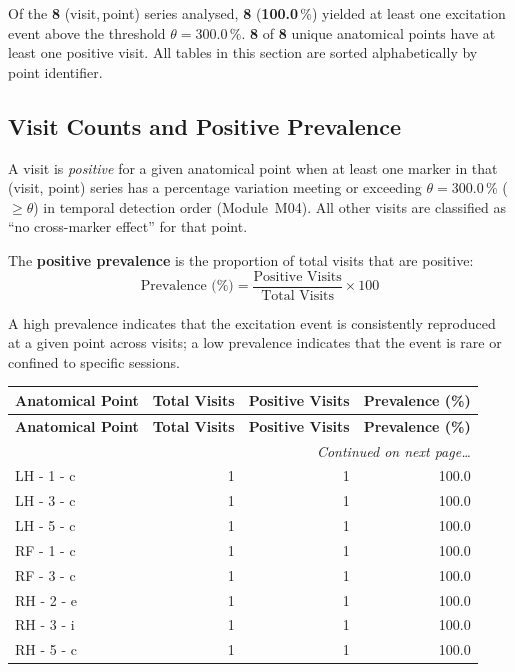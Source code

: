\documentclass[a4paper,11pt]{article}
\begin{document}
\noindent
Of the \textbf{8} (visit,\,point) series analysed,
\textbf{8} (\textbf{100.0}\,\%) yielded at least one
excitation event above the threshold $\theta = 300.0\,\%$.
\textbf{8} of \textbf{8} unique anatomical points
have at least one positive visit.
All tables in this section are sorted alphabetically by point identifier.

\subsection{Visit Counts and Positive Prevalence}

A visit is \emph{positive} for a given anatomical point when at least one marker in that
(visit, point) series has a percentage variation meeting or exceeding
$\theta = 300.0\,\%$ ($\geq \theta$) in temporal detection order (Module~M04).
All other visits are classified as ``no cross-marker effect'' for that point.

The \textbf{positive prevalence} is the proportion of total visits that are positive:
\[
  \text{Prevalence (\%)} = \frac{\text{Positive Visits}}{\text{Total Visits}} \times 100
\]

A high prevalence indicates that the excitation event is consistently reproduced at a given
point across visits; a low prevalence indicates that the event is rare or confined to
specific sessions.

\begin{small}
\begin{longtable}{p{5cm}rrr}
\toprule
\textbf{Anatomical Point} &
\textbf{Total Visits} &
\textbf{Positive Visits} &
\textbf{Prevalence (\%)} \\
\midrule
\endfirsthead
\toprule
\textbf{Anatomical Point} &
\textbf{Total Visits} &
\textbf{Positive Visits} &
\textbf{Prevalence (\%)} \\
\midrule
\endhead
\midrule
\multicolumn{4}{r}{\small\emph{Continued on next page\ldots}} \\
\endfoot
\bottomrule
\endlastfoot
LH - 1 - c & 1 & 1 & 100.0 \\
LH - 3 - c & 1 & 1 & 100.0 \\
LH - 5 - c & 1 & 1 & 100.0 \\
RF - 1 - c & 1 & 1 & 100.0 \\
RF - 3 - c & 1 & 1 & 100.0 \\
RH - 2 - e & 1 & 1 & 100.0 \\
RH - 3 - i & 1 & 1 & 100.0 \\
RH - 5 - c & 1 & 1 & 100.0 \\
\end{longtable}
\end{small}
\end{document}
